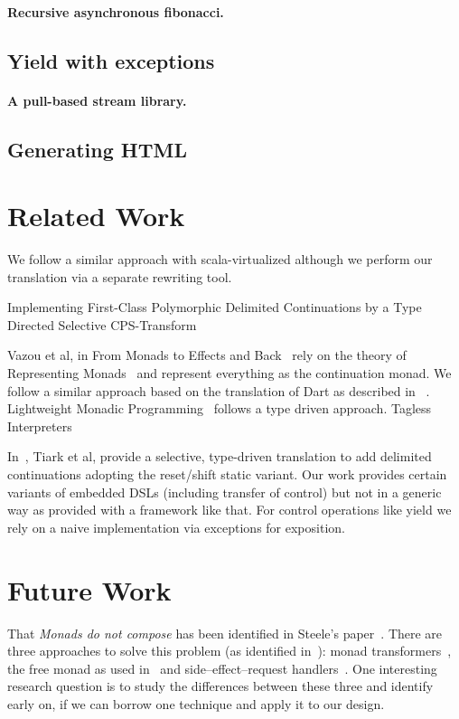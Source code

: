 \documentclass{sigplanconf}
\begin{document}
\paragraph{Recursive asynchronous fibonacci. }

\subsection{Yield with exceptions}

\paragraph{A pull-based stream library. }

\subsection{Generating HTML}


\section{Related Work}

We follow a similar approach with scala-virtualized
\cite{moors_scalavirtualized_2012} although we perform our translation via a
separate rewriting tool.

Implementing First-Class Polymorphic Delimited Continuations by a Type
Directed Selective CPS-Transform~\cite{rompf_shift_2009}

Vazou et al, in From Monads to Effects and 
Back~\cite{vazou_koka_2016} rely on the theory of Representing 
Monads~\cite{filinski_representing_1994} and represent everything
as the continuation monad. We follow a similar approach based on the 
translation of Dart as described in ~\cite{meijer_dar_2015}. Lightweight
Monadic Programming~\cite{swamy_lightweight_2011} follows a type driven
approach. Tagless Interpreters~\cite{carette_finally_2007}

In~\cite{rompf_shift_2009}, Tiark et al, provide a selective, type-driven 
translation to add delimited continuations adopting the reset/shift static 
variant. Our work provides certain variants of embedded DSLs (including 
transfer of control) but not in a generic way as provided with a framework
like that. For control operations like yield we rely on a naive implementation 
via exceptions for exposition.

\section{Future Work}

That \emph{Monads do not compose} has been identified in Steele's
paper~\cite{steele_building_1994}. There are three approaches to solve
this problem (as identified in~\cite{kiselyov_freer_2015}): monad
transformers~\cite{liang_monad_1995}, the free monad as used
in~\cite{swierstra_data_2008} and side--effect--request
handlers~\cite{cartwright_extensible_1994}. One interesting research
question is to study the differences between these three and identify
early on, if we can borrow one technique and apply it to our
design. 



\end{document}
